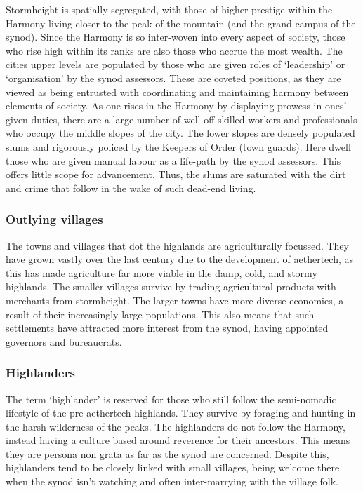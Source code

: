 \documentclass[a4paper,11pt,oneside]{book}
\begin{document}
Stormheight is spatially segregated, with those of higher prestige within the Harmony living closer to the peak of the mountain (and the grand campus of the synod). Since the Harmony is so inter-woven into every aspect of society, those who rise high within its ranks are also those who accrue the most wealth. The cities upper levels are populated by those who are given roles of `leadership' or `organisation' by the synod assessors. These are coveted positions, as they are viewed as being entrusted with coordinating and maintaining harmony between elements of society. As one rises in the Harmony by displaying prowess in ones' given duties, there are a large number of well-off skilled workers and professionals who occupy the middle slopes of the city. The lower slopes are densely populated slums and rigorously policed by the Keepers of Order (town guards). Here dwell those who are given manual labour as a life-path by the synod assessors. This offers little scope for advancement. Thus, the slums are saturated with the dirt and crime that follow in the wake of such dead-end living.   

\subsubsection{Outlying villages}
The towns and villages that dot the highlands are agriculturally focussed. They have grown vastly over the last century due to the development of aethertech, as this has made agriculture far more viable in the damp, cold, and stormy highlands. The smaller villages survive by trading agricultural products with merchants from stormheight. The larger towns have more diverse economies, a result of their increasingly large populations. This also means that such settlements have attracted more interest from the synod, having appointed governors and bureaucrats. 

\subsubsection{Highlanders}
The term `highlander' is reserved for those who still follow the semi-nomadic lifestyle of the pre-aethertech highlands. They survive by foraging and hunting in the harsh wilderness of the peaks. The highlanders do not follow the Harmony, instead having a culture based around reverence for their ancestors. This means they are persona non grata as far as the synod are concerned. Despite this, highlanders tend to be closely linked with small villages, being welcome there when the synod isn't watching and often inter-marrying with the village folk.   
\end{document}
